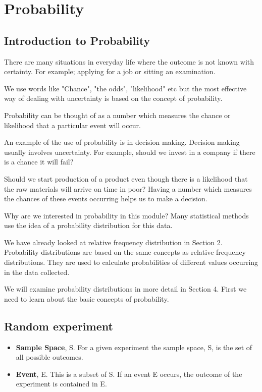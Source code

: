 \documentclass[12pt]{article}
\begin{document}

\newpage
\section{Probability}

\subsection{Introduction to Probability}

There are many situations in everyday life where the outcome is not known with certainty. For example; applying for a job or sitting an examination.

We use words like "Chance", "the odds", "likelihood" etc but the most effective way of dealing with uncertainty is based on the concept of probability.

Probability can be thought of as a number which measures the chance or likelihood that a particular event will occur.


An example of the use of probability is in decision making. Decision making usually involves uncertainty. For example, should we invest in a company if there is a chance it will fail? 

Should we start production of a product even though there is a likelihood that the raw materials will arrive on time in poor? Having a number which measures the chances of these events occurring helps us to make a decision.



Why are we interested in probability in this module? Many statistical methods use the idea of a probability distribution for this data.

We have already looked at relative frequency distribution in Section 2. Probability distributions are based on the same concepts as relative frequency distributions. They are used to calculate probabilities of different values occurring in the data collected.

We will examine probability distributions in more detail in Section 4. First we need to learn about the basic concepts of probability.


\subsection{Random experiment}
\begin{itemize}
\item \textbf{Sample Space}, S. For a given experiment the sample space, S, is the set of all
possible outcomes.
\item \textbf{Event}, E. This is a subset of S. If an event E occurs, the outcome of the experiment is contained in E.
\end{itemize}
\end{document}
